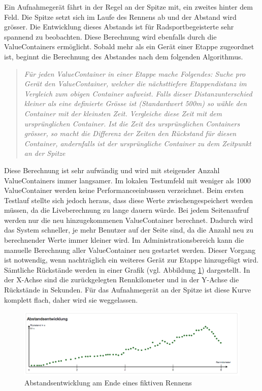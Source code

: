 Ein Aufnahmegerät fährt in der Regel an der Spitze mit, ein zweites hinter dem Feld. Die Spitze setzt sich im Laufe des Rennens ab und der Abstand wird grösser. Die Entwicklung dieses Abstands ist für Radsportbegeisterte sehr spannend zu beobachten. Diese Berechnung wird ebenfalls durch die ValueContainers ermöglicht. Sobald mehr als ein Gerät einer Etappe zugeordnet ist, beginnt die Berechnung des Abstandes nach dem folgenden Algorithmus.
\begin{quotation}
\label{quot:deficitealgo}
\textit{Für jeden ValueContainer in einer Etappe mache Folgendes:
Suche pro Gerät den ValueContainer, welcher die nächsttiefere Etappendistanz im Vergleich zum obigen Container aufweist. Falls dieser Distanzunterschied kleiner als eine definierte Grösse ist (Standardwert 500m) so wähle den Container mit der kleinsten Zeit. Vergleiche diese Zeit mit dem ursprünglichen Container. Ist die Zeit des ursprünglichen Containers grösser, so macht die Differenz der Zeiten den Rückstand für diesen Container, andernfalls ist der ursprüngliche Container zu dem Zeitpunkt an der Spitze}
\end{quotation}

Diese Berechnung ist sehr aufwändig und wird mit steigender Anzahl ValueContainers immer langsamer. Im lokalen Testumfeld mit weniger als 1000 ValueContainer werden keine Performanceeinbussen verzeichnet. Beim ersten Testlauf stellte sich jedoch heraus, dass diese Werte zwischengespeichert werden müssen, da die Liveberechnung zu lange dauern würde. Bei jedem Seitenaufruf werden nur die neu hinzugekommenen ValueContainer berechnet. Dadurch wird das System schneller, je mehr Benutzer auf der Seite sind, da die Anzahl neu zu berechnender Werte immer kleiner wird. Im Administrationsbereich kann die manuelle Berechnung aller ValueContainer neu gestartet werden. Dieser Vorgang ist notwendig, wenn nachträglich ein weiteres Gerät zur Etappe hinzugefügt wird.
\\

Sämtliche Rückstände werden in einer Grafik (vgl. Abbildung  \ref{fig:abstandsentwicklung2}) dargestellt. In der X-Achse sind die zurückgelegten Rennkilometer und in der Y-Achse die Rückstände in Sekunden. Für das Aufnahmegerät an der Spitze ist diese Kurve komplett flach, daher wird sie weggelassen.

\begin{figure}[H]
	\centering
	\includegraphics[width=130mm]{images/tourliveweb/abstandsentwicklung2.png}
	\caption{Abstandsentwicklung am Ende eines fiktiven Rennens}
	\label{fig:abstandsentwicklung2}
\end{figure}

